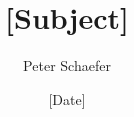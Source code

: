

  
\title{[Subject]}
\author{Peter Schaefer}
\date{[Date]}



\maketitle
\tableofcontents
\newpage

